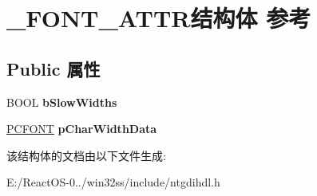 \hypertarget{struct___f_o_n_t___a_t_t_r}{}\section{\+\_\+\+F\+O\+N\+T\+\_\+\+A\+T\+T\+R结构体 参考}
\label{struct___f_o_n_t___a_t_t_r}
\subsection*{Public 属性}
\begin{DoxyCompactItemize}
\item 
\mbox{\label{struct___f_o_n_t___a_t_t_r_abf62b7b94aada3b628e4666a47017cc2}} 
B\+O\+OL {\bfseries b\+Slow\+Widths}
\item 
\mbox{\label{struct___f_o_n_t___a_t_t_r_aa04ede3243f04478833a9ac624fc3a94}} 
\hyperlink{struct___c_f_o_n_t}{P\+C\+F\+O\+NT} {\bfseries p\+Char\+Width\+Data}
\end{DoxyCompactItemize}


该结构体的文档由以下文件生成\+:\begin{DoxyCompactItemize}
\item 
E\+:/\+React\+O\+S-\/0../win32ss/include/ntgdihdl.\+h\end{DoxyCompactItemize}
